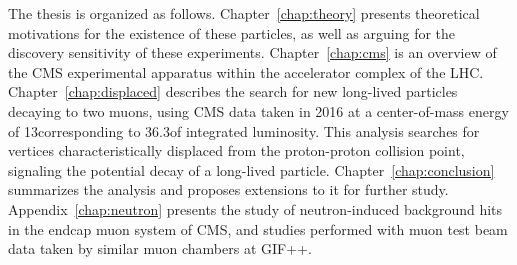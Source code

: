 The thesis is organized as follows.
Chapter~\ref{chap:theory} presents theoretical motivations for the existence of these particles, as well as arguing for the discovery sensitivity of these experiments.
Chapter~\ref{chap:cms} is an overview of the CMS experimental apparatus within the accelerator complex of the LHC.
Chapter~\ref{chap:displaced} describes the search for new long-lived particles decaying to two muons, using CMS data taken in 2016 at a center-of-mass energy of 13\TeV corresponding to 36.3\fbinv of integrated luminosity.
This analysis searches for vertices characteristically displaced from the proton-proton collision point, signaling the potential decay of a long-lived particle.
Chapter~\ref{chap:conclusion} summarizes the analysis and proposes extensions to it for further study.
Appendix~\ref{chap:neutron} presents the study of neutron-induced background hits in the endcap muon system of CMS, and studies performed with muon test beam data taken by similar muon chambers at GIF++.
